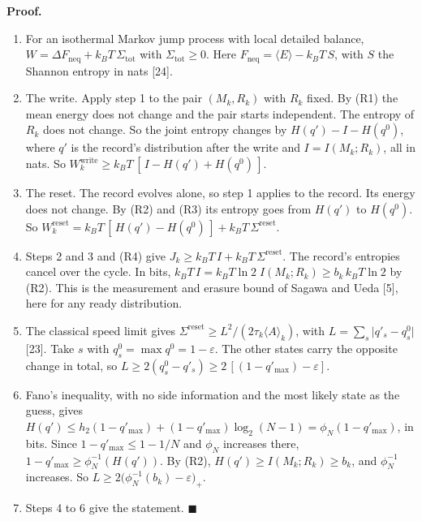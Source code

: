 \documentclass[
  10pt,
]{article}
\providecommand{\tightlist}{%
  \setlength{\itemsep}{0pt}\setlength{\parskip}{0pt}}
\begin{document}
\textbf{Proof.}

\begin{enumerate}
\def\labelenumi{\arabic{enumi}.}
\tightlist
\item
  For an isothermal Markov jump process with local detailed balance,
  \(W = \Delta F_{\mathrm{neq}} + k_B T\, \Sigma_{\mathrm{tot}}\) with
  \(\Sigma_{\mathrm{tot}} \ge 0\). Here
  \(F_{\mathrm{neq}} = \langle E\rangle - k_B T\, S\), with \(S\) the
  Shannon entropy in nats {[}24{]}.
\item
  The write. Apply step 1 to the pair \((M_k, R_k)\) with \(R_k\) fixed.
  By (R1) the mean energy does not change and the pair starts
  independent. The entropy of \(R_k\) does not change. So the joint
  entropy changes by \(H(q') - I - H(q^0)\), where \(q'\) is the
  record's distribution after the write and \(I = I(M_k; R_k)\), all in
  nats. So \(W_k^{\mathrm{write}} \ge k_B T\,[\,I - H(q') + H(q^0)\,]\).
\item
  The reset. The record evolves alone, so step 1 applies to the record.
  Its energy does not change. By (R2) and (R3) its entropy goes from
  \(H(q')\) to \(H(q^0)\). So
  \(W_k^{\mathrm{reset}} = k_B T\,[\,H(q') - H(q^0)\,] + k_B T\, \Sigma^{\mathrm{reset}}\).
\item
  Steps 2 and 3 and (R4) give
  \(J_k \ge k_B T\, I + k_B T\, \Sigma^{\mathrm{reset}}\). The record's
  entropies cancel over the cycle. In bits,
  \(k_B T\, I = k_B T\ln 2\; I(M_k;R_k) \ge b_k\, k_B T\ln 2\) by (R2).
  This is the measurement and erasure bound of Sagawa and Ueda {[}5{]},
  here for any ready distribution.
\item
  The classical speed limit gives
  \(\Sigma^{\mathrm{reset}} \ge L^2/(2\tau_k\langle A\rangle_k)\), with
  \(L = \sum_s \lvert q'_s - q^0_s\rvert\) {[}23{]}. Take \(s\) with
  \(q^0_s = \max q^0 = 1 - \varepsilon\). The other states carry the
  opposite change in total, so
  \(L \ge 2(q^0_s - q'_s) \ge 2\,[(1 - q'_{\max}) - \varepsilon]\).
\item
  Fano's inequality, with no side information and the most likely state
  as the guess, gives
  \(H(q') \le h_2(1-q'_{\max}) + (1-q'_{\max})\log_2(N-1) = \phi_N(1 - q'_{\max})\),
  in bits. Since \(1 - q'_{\max} \le 1 - 1/N\) and \(\phi_N\) increases
  there, \(1 - q'_{\max} \ge \phi_N^{-1}(H(q'))\). By (R2),
  \(H(q') \ge I(M_k;R_k) \ge b_k\), and \(\phi_N^{-1}\) increases. So
  \(L \ge 2\big(\phi_N^{-1}(b_k) - \varepsilon\big)_+\).
\item
  Steps 4 to 6 give the statement. \(\blacksquare\)
\end{enumerate}
\end{document}
